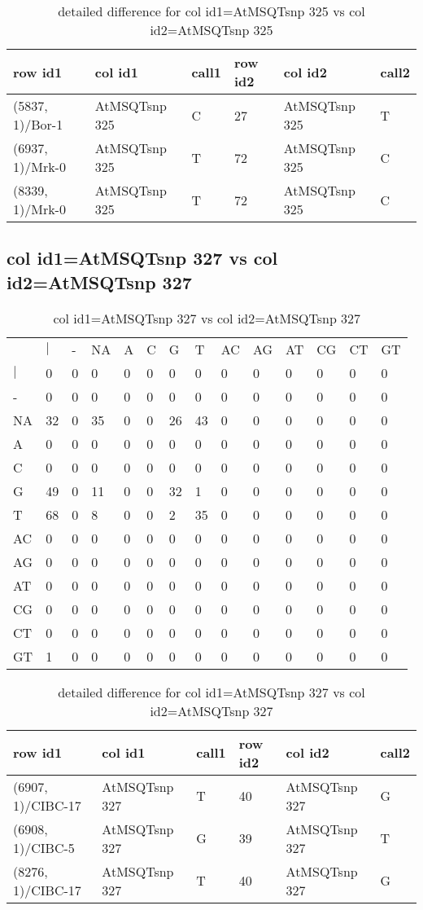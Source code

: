\begin{center}
\begin{longtable}{|l|l|l|l|l|l|}
\caption{detailed difference for col id1=AtMSQTsnp 325 vs col id2=AtMSQTsnp 325} \label{table_dm861}\\
\hline
row id1&col id1&call1&row id2&col id2&call2\\
\hline
(5837, 1)/Bor-1&AtMSQTsnp 325&C&27&AtMSQTsnp 325&T\\
(6937, 1)/Mrk-0&AtMSQTsnp 325&T&72&AtMSQTsnp 325&C\\
(8339, 1)/Mrk-0&AtMSQTsnp 325&T&72&AtMSQTsnp 325&C\\
\hline
\end{longtable}
\end{center}

\subsection{col id1=AtMSQTsnp 327 vs col id2=AtMSQTsnp 327}
\begin{center}
\begin{longtable}{|l|l|l|l|l|l|l|l|l|l|l|l|l|l|}
\caption{col id1=AtMSQTsnp 327 vs col id2=AtMSQTsnp 327} \label{table_dm862}\\
\hline
\\
\hline
&$|$&-&NA&A&C&G&T&AC&AG&AT&CG&CT&GT\\
$|$&0&0&0&0&0&0&0&0&0&0&0&0&0\\
-&0&0&0&0&0&0&0&0&0&0&0&0&0\\
NA&32&0&35&0&0&26&43&0&0&0&0&0&0\\
A&0&0&0&0&0&0&0&0&0&0&0&0&0\\
C&0&0&0&0&0&0&0&0&0&0&0&0&0\\
G&49&0&11&0&0&32&1&0&0&0&0&0&0\\
T&68&0&8&0&0&2&35&0&0&0&0&0&0\\
AC&0&0&0&0&0&0&0&0&0&0&0&0&0\\
AG&0&0&0&0&0&0&0&0&0&0&0&0&0\\
AT&0&0&0&0&0&0&0&0&0&0&0&0&0\\
CG&0&0&0&0&0&0&0&0&0&0&0&0&0\\
CT&0&0&0&0&0&0&0&0&0&0&0&0&0\\
GT&1&0&0&0&0&0&0&0&0&0&0&0&0\\
\hline
\end{longtable}
\end{center}

\begin{center}
\begin{longtable}{|l|l|l|l|l|l|}
\caption{detailed difference for col id1=AtMSQTsnp 327 vs col id2=AtMSQTsnp 327} \label{table_dm863}\\
\hline
row id1&col id1&call1&row id2&col id2&call2\\
\hline
(6907, 1)/CIBC-17&AtMSQTsnp 327&T&40&AtMSQTsnp 327&G\\
(6908, 1)/CIBC-5&AtMSQTsnp 327&G&39&AtMSQTsnp 327&T\\
(8276, 1)/CIBC-17&AtMSQTsnp 327&T&40&AtMSQTsnp 327&G\\
\hline
\end{longtable}
\end{center}

